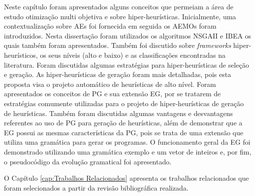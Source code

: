 Neste capítulo foram apresentados alguns conceitos que permeiam a área de estudo otimização multi objetiva e sobre hiper-heurísticas. Inicialmente, uma contextualização sobre AEs foi fornecida em seguida os AEMOs foram introduzidos. Nesta dissertação foram utilizados os algoritmos NSGAII e IBEA os quais também foram apresentados. Também foi discutido sobre \textit{frameworks} hiper-heurísticos,  os seus níveis (alto e baixo) e as classificações encontradas na literatura.  Foram discutidas algumas estratégias para hiper-heurísticas de seleção e geração. As hiper-heurísticas de geração foram mais detalhadas, pois esta proposta visa o projeto  automático de heurísticas de alto nível. Foram apresentados os conceitos de PG e sua extensão EG, por se tratarem de estratégias comumente utilizadas para o projeto de hiper-heurísticas de geração de heurísticas. Também foram discutidas algumas vantagens e desvantagens referentes ao uso de PG para geração de heurísticas, além de demonstrar que a EG possui as mesmas características da PG, pois se trata de uma extensão que utiliza uma gramática para gerar os programas. O funcionamento geral da EG foi demonstrado utilizando uma gramática exemplo e um vetor de inteiros e, por fim, o pseudocódigo da evolução gramatical foi apresentado. 

O Capítulo \ref{cap:Trabalhos Relacionados} apresenta os trabalhos relacionados que foram selecionados a partir da revisão bibliográfica realizada.



